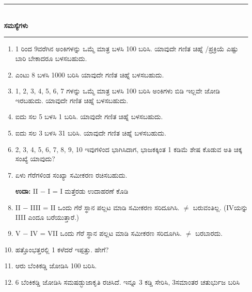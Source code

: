 \chapter[ಅಧ್ಯಾಯ 3]{}\label{chap3}

\begin{center}
\rule{5cm}{1pt}\\[5pt]
{\Large\bfseries ಸಮಸ್ಯೆಗಳು}\\[3pt]
\rule{5cm}{1pt}
\end{center}

\smallskip
\begin{enumerate}
\renewcommand{\labelenumi}{\bf\theenumi.}
\itemsep=5pt
\item 1 ರಿಂದ 9ವರೆಗಿನ ಅಂಕಿಗಳನ್ನು ಒಮ್ಮೆ ಮಾತ್ರ ಬಳಸಿ 100 ಬರಿಸಿ. ಯಾವುದೇ ಗಣಿತ ಚಿಹ್ನೆ /ಪ್ರಕ್ರಿಯೆ ಎಷ್ಟು ಬಾರಿ ಬೇಕಾದರೂ ಬಳಸಬಹುದು.

\item ಎಂಟು 8 ಬಳಸಿ 1000 ಬರಿಸಿ ಯಾವುದೇ ಗಣಿತ ಚಿಹ್ನೆ ಬಳಸಬಹುದು.

\item 1, 2, 3, 4, 5, 6, 7 ಗಳನ್ನು ಒಮ್ಮೆ ಮಾತ್ರ ಬಳಸಿ 100 ಬರಿಸಿ ಅಂಕಿಗಳು ಬಿಡಿ ಇಲ್ಲವೇ ಜೋಡಿ ಇರಬಹುದು. ಯಾವುದೇ ಗಣಿತ ಚಿಹ್ನೆ ಬಳಸಬಹುದು.

\item ಐದು ಸಲ 5 ಬಳಸಿ 1  ಬರಿಸಿ. ಯಾವುದೇ ಗಣಿತ ಚಿಹ್ನೆ ಬಳಸಬಹುದು.

\item ಐದು ಸಲ 3 ಬಳಸಿ 31 ಬರಿಸಿ. ಯಾವುದೇ ಗಣಿತ ಚಿಹ್ನೆ  ಬಳಸಬಹುದು. 

\item 2, 3, 4, 5, 6, 7, 8, 9, 10 ಇವುಗಳಿಂದ ಭಾಗಿಸಿದಾಗ, ಭಾಜಕಕ್ಕಿಂತ 1 ಕಡಿಮೆ ಶೇಷ ಕೊಡುವ ಅತಿ ಚಿಕ್ಕ ಸಂಖ್ಯೆ ಯಾವುದು? 

\item ಏಳು ಗೆರೆಗಳಿಂಡ ಸಂಖ್ಯಾ ಸಮೀಕರಣ ರಚಿಸಬಹುದು. 

{\bf ಉದಾ:} II $-$ I = I ಮತ್ತೆರಡು ಉದಾಹರಣೆ ಕೊಡಿ

\item II $-$ IIII = II ಒಂದು ಗೆರೆ ಸ್ಥಾನ ಪಲ್ಲಟ ಮಾಡಿ ಸಮೀಕರಣ ಸರಿದೂಗಿಸಿ. $\neq$ ಬರುವಂತಿಲ್ಲ. (IVಯನ್ನು IIII ಎಂದೂ ಬರೆಯುತ್ತಾರೆ.) 

\item V $-$ IV = VII ಒಂದು ಗೆರೆ ಸ್ಥಾನ ಪಲ್ಲಟ ಮಾಡಿ ಸಮೀಕರಣ ಸರಿದೂಗಿಸಿ. $\neq$ ಬರಬಾರದು.

\item ಹತ್ತೊಂಭತ್ತರಲ್ಲಿ 1 ಕಳೆದರೆ ಇಪ್ಪತ್ತು. ಹೇಗೆ?

\item ಆರು ಬೆಂಕಿಕಡ್ಡಿ ಜೋಡಿಸಿ 100 ಬರಿಸಿ.

\item 6 ಬೆಂಕಿಕಡ್ಡಿ ಜೋಡಿಸಿ ಸಮಷಡ್ಭುಜಾಕೃತಿ ರಚಿಸಿದೆ. ಇನ್ನೂ 3 ಕಡ್ಡಿ  ಸೇರಿಸಿ, 3\break ಸಮಾಂತರ ಚತುರ್ಭುಜ ಬರಿಸಿ 


\end{enumerate}
